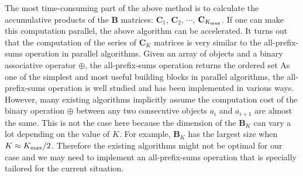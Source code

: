 The most time-consuming part of the above method is to calculate the accumulative products of the $\mathbf{B}$ 
matrices: $\mathbf{C}_1$, $\mathbf{C}_2$, $\cdots$, $\mathbf{C}_{K_{\rm max}}$. If one can make this computation
parallel, the above algorithm can be accelerated. It turns out that the computation of the series of $\mathbf{C}_K$ 
matrices is very similar to the all-prefix-sums operation in parallel algorithms\cite{BlellochTR90}. Given an array of objects
\oneline{[a_1, a_2, \cdots, a_n] \nonumber }
and a binary associative operator $\oplus$, the all-prefix-sums operation returns the ordered set
As one of the simplest and most useful building blocks in parallel algorithms\cite{BlellochTR90}, the all-prefix-sums 
operation is well studied and has been implemented in various ways\cite{gpu-book}. However, many existing 
algorithms implicitly assume the computation cost of the binary operation $\oplus$ between any two consecutive 
objects $a_i$ and $a_{i+1}$ are almost the same. This is not the case here because the dimension of the $\mathbf{B}_{K}$ can
vary a lot depending on the value of $K$. For example,  $\mathbf{B}_{K}$ has the largest size when $K\approx K_{\rm max}/2$. 
Therefore the existing algorithms might not be optimal for our case and we may need to implement an all-prefix-sums 
operation that is specially tailored for the current 
situation. 















 